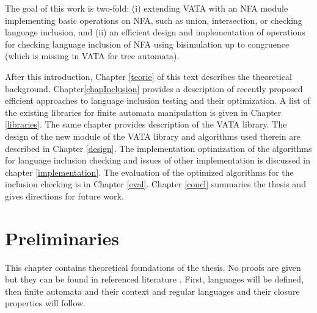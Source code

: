 The goal of this work is two-fold: (i) extending VATA with an NFA module implementing basic operations on NFA, such as union, intersection, or 
checking language inclusion, and (ii) an efficient design and implementation of operations for checking language inclusion of NFA using 
bisimulation up to congruence (which is missing in VATA for tree automata).

After this introduction, Chapter \ref{teorie} of this text describes the theoretical background. 
Chapter\ref{chapInclusion} provides a description of recently proposed 
efficient approaches to language inclusion testing and their optimization.
A list of the existing libraries for finite automata manipulation is given in Chapter \ref{libraries}. The same chapter
provides description of the VATA library. 
The design of the new module of the VATA library and algorithms used therein are described in Chapter \ref{design}. 
The implementation optimization of the algorithms for language inclusion checking and issues of other implementation is discussed in chapter \ref{implementation}.
The evaluation of the optimized algorithms for the inclusion checking is in Chapter \ref{eval}. Chapter \ref{concl} summaries the thesis and gives directions for
future work.

\chapter{Preliminaries}
This chapter contains theoretical foundations of the thesis. No proofs are given but they can be found in referenced literature \cite{kozen,ullman}. 
First, languages will be defined, then finite automata and their context and regular languages and their closure properties will follow. 
\label{teorie}

